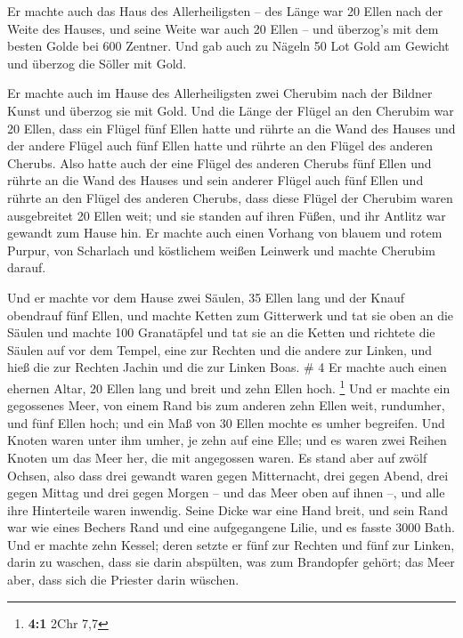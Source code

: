  Er machte auch das Haus des Allerheiligsten -- des Länge
war 20 Ellen nach der Weite des Hauses, und seine Weite war auch 20
Ellen -- und überzog's mit dem besten Golde bei 600 Zentner.
 Und gab auch zu Nägeln 50 Lot Gold am Gewicht und überzog
die Söller mit Gold.

 Er machte auch im Hause des Allerheiligsten zwei Cherubim
nach der Bildner Kunst und überzog sie mit Gold.  Und die
Länge der Flügel an den Cherubim war 20 Ellen, dass ein Flügel fünf
Ellen hatte und rührte an die Wand des Hauses und der andere Flügel auch
fünf Ellen hatte und rührte an den Flügel des anderen Cherubs.
 Also hatte auch der eine Flügel des anderen Cherubs fünf
Ellen und rührte an die Wand des Hauses und sein anderer Flügel auch
fünf Ellen und rührte an den Flügel des anderen Cherubs, 
dass diese Flügel der Cherubim waren ausgebreitet 20 Ellen weit; und sie
standen auf ihren Füßen, und ihr Antlitz war gewandt zum Hause hin.
 Er machte auch einen Vorhang von blauem und rotem Purpur,
von Scharlach und köstlichem weißen Leinwerk und machte Cherubim darauf.

 Und er machte vor dem Hause zwei Säulen, 35 Ellen lang und
der Knauf obendrauf fünf Ellen,  und machte Ketten zum
Gitterwerk und tat sie oben an die Säulen und machte 100 Granatäpfel und
tat sie an die Ketten  und richtete die Säulen auf vor dem
Tempel, eine zur Rechten und die andere zur Linken, und hieß die zur
Rechten Jachin und die zur Linken Boas. \# 4  Er machte auch
einen ehernen Altar, 20 Ellen lang und breit und zehn Ellen hoch.
\footnote{\textbf{4:1} 2Chr 7,7}  Und er machte ein
gegossenes Meer, von einem Rand bis zum anderen zehn Ellen weit,
rundumher, und fünf Ellen hoch; und ein Maß von 30 Ellen mochte es umher
begreifen.  Und Knoten waren unter ihm umher, je zehn auf
eine Elle; und es waren zwei Reihen Knoten um das Meer her, die mit
angegossen waren.  Es stand aber auf zwölf Ochsen, also dass
drei gewandt waren gegen Mitternacht, drei gegen Abend, drei gegen
Mittag und drei gegen Morgen -- und das Meer oben auf ihnen --, und alle
ihre Hinterteile waren inwendig.  Seine Dicke war eine Hand
breit, und sein Rand war wie eines Bechers Rand und eine aufgegangene
Lilie, und es fasste 3000 Bath.  Und er machte zehn Kessel;
deren setzte er fünf zur Rechten und fünf zur Linken, darin zu waschen,
dass sie darin abspülten, was zum Brandopfer gehört; das Meer aber, dass
sich die Priester darin wüschen.


